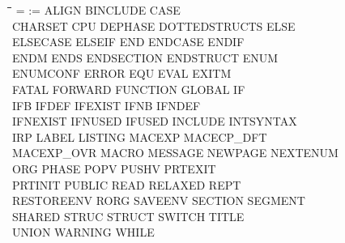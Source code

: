 {\tt\begin{tabbing}
\hspace{3cm}\=\hspace{3cm}\=\hspace{3cm}\=\hspace{3cm}\=\kill
=          \> :=          \> ALIGN       \> BINCLUDE    \> CASE \\
CHARSET    \> CPU         \> DEPHASE     \> DOTTEDSTRUCTS\> ELSE \\
ELSECASE   \> ELSEIF      \> END         \> ENDCASE     \> ENDIF \\
ENDM       \> ENDS        \> ENDSECTION  \> ENDSTRUCT   \> ENUM \\
ENUMCONF   \> ERROR       \> EQU         \> EVAL        \> EXITM \\
FATAL      \> FORWARD     \> FUNCTION    \> GLOBAL      \> IF \\
IFB        \> IFDEF       \> IFEXIST     \> IFNB        \> IFNDEF \\
IFNEXIST   \> IFNUSED     \> IFUSED      \> INCLUDE     \> INTSYNTAX \\
IRP        \> LABEL       \> LISTING     \> MACEXP      \> MACECP\_DFT \\
MACEXP\_OVR \> MACRO      \> MESSAGE     \> NEWPAGE     \> NEXTENUM \\
ORG        \> PHASE       \> POPV        \> PUSHV       \> PRTEXIT \\
PRTINIT    \> PUBLIC      \> READ        \> RELAXED     \> REPT \\
RESTOREENV \> RORG        \> SAVEENV     \> SECTION     \> SEGMENT \\
SHARED     \> STRUC       \> STRUCT      \> SWITCH      \> TITLE \\
UNION      \> WARNING     \> WHILE \\
\end{tabbing}}
